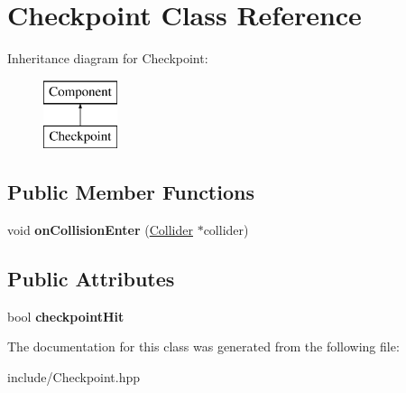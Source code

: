\hypertarget{class_checkpoint}{\section{Checkpoint Class Reference}
\label{class_checkpoint}
}
Inheritance diagram for Checkpoint\-:\begin{figure}[H]
\begin{center}
\leavevmode
\includegraphics[height=2.000000cm]{class_checkpoint}
\end{center}
\end{figure}
\subsection*{Public Member Functions}
\begin{DoxyCompactItemize}
\item 
\hypertarget{class_checkpoint_ab5c15fbaf056355222719efef76600b3}{void {\bfseries on\-Collision\-Enter} (\hyperlink{class_collider}{Collider} $\ast$collider)}\label{class_checkpoint_ab5c15fbaf056355222719efef76600b3}

\end{DoxyCompactItemize}
\subsection*{Public Attributes}
\begin{DoxyCompactItemize}
\item 
\hypertarget{class_checkpoint_a95203681472c2a7d6cb98ae6dbb72f69}{bool {\bfseries checkpoint\-Hit}}\label{class_checkpoint_a95203681472c2a7d6cb98ae6dbb72f69}

\end{DoxyCompactItemize}


The documentation for this class was generated from the following file\-:\begin{DoxyCompactItemize}
\item 
include/Checkpoint.\-hpp\end{DoxyCompactItemize}

